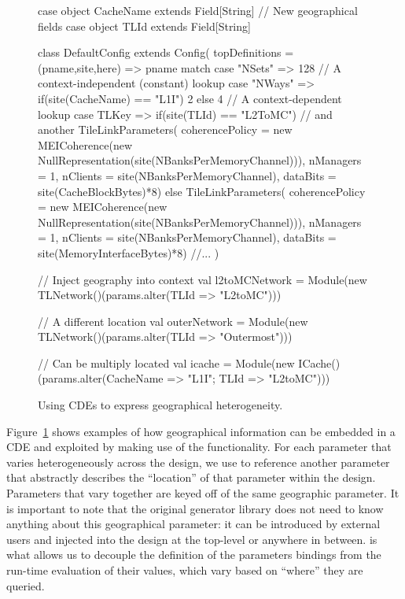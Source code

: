 \begin{figure}
\centering
\begin{scala}
case object CacheName extends Field[String] // New geographical fields
case object TLId extends Field[String]

class DefaultConfig extends Config(
  topDefinitions = { (pname,site,here) =>
    pname match {
      case "NSets" => 128 // A context-independent (constant) lookup
      case "NWays" => if(site(CacheName) == "L1I") 2 else 4 // A context-dependent lookup
      case TLKey => if(site(TLId) == "L2ToMC") {            // and another
          TileLinkParameters(
            coherencePolicy = new MEICoherence(new NullRepresentation(site(NBanksPerMemoryChannel))),
            nManagers = 1,
            nClients = site(NBanksPerMemoryChannel),
            dataBits = site(CacheBlockBytes)*8)
        } else {
          TileLinkParameters(
            coherencePolicy = new MEICoherence(new NullRepresentation(site(NBanksPerMemoryChannel))),
            nManagers = 1,
            nClients = site(NBanksPerMemoryChannel),
            dataBits = site(MemoryInterfaceBytes)*8)
        }
      //...
    }
  }
)

// Inject geography into context
val l2toMCNetwork = Module(new TLNetwork()(params.alter({TLId => "L2toMC"})))

// A different location
val outerNetwork = Module(new TLNetwork()(params.alter({TLId => "Outermost"})))

// Can be multiply located
val icache = Module(new ICache()(params.alter({CacheName => "L1I"; TLId => "L2toMC"})))

\end{scala} 
\caption{Using CDEs to express geographical heterogeneity.}
\label{fig:geo}
\end{figure}

Figure~\ref{fig:geo} shows examples of how geographical information can be embedded in a CDE
and exploited by making use of the  functionality.
For each parameter that varies heterogeneously across the design, we use 
to reference another parameter that abstractly describes the ``location'' of that parameter within the design.
Parameters that vary together are keyed off of the same geographic parameter.
It is important to note that the original generator library does not need to know anything about
this geographical parameter:
it can be introduced by external users and injected into the design at the top-level or anywhere in between.
 is what allows us to decouple the definition of the parameters bindings from the run-time evaluation of their values,
which vary based on ``where'' they are queried.

